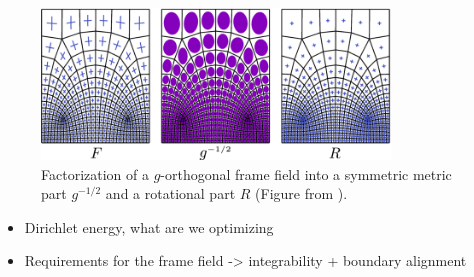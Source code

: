 \documentclass[../thesis.tex]{subfiles}
\begin{document}
\begin{figure}[htb]
  \centering
  \includegraphics[width=25em]{figures/factorization}
  \caption{Factorization of a $g$-orthogonal frame field into a symmetric metric part $g^{-1/2}$ and a rotational part $R$
  (Figure from \cite{Fang23}).}
  \label{fig:factorization}
\end{figure}



\begin{itemize}
  \item Dirichlet energy, what are we optimizing
  \item Requirements for the frame field -> integrability + boundary alignment
\end{itemize}
\end{document}
